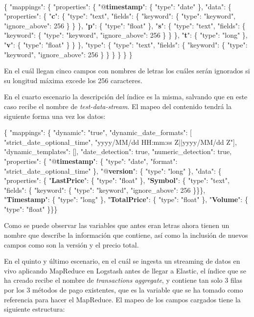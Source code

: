 \paragraph{}

\{ "mappings": \{ "properties": \{ "@\textbf{timestamp}": \{ "type": "date" \}, "data": \{ "properties": \{ "\textbf{c}": \{ "type": "text", "fields": \{ "keyword": \{ "type": "keyword", "ignore\_above": 256 \} \} \}, "\textbf{p}": \{ "type": "float" \}, "\textbf{s}": \{ "type": "text", "fields": \{ "keyword": \{ "type": "keyword", "ignore\_above": 256 \} \} \}, "\textbf{t}": \{ "type": "long" \}, "\textbf{v}": \{ "type": "float" \} \} \}, "type": \{ "type": "text", "fields": \{ "keyword": \{ "type": "keyword", "ignore\_above": 256 \} \} \} \} \} \} 

En el cuál llegan cinco campos con nombres de letras los cuáles serán ignorados si su longitud máxima excede los 256 caracteres.

En el cuarto escenario la descripción del índice es la misma, salvando que en este caso recibe el nombre de \textit{test-data-stream}. El mapeo del contenido tendrá la siguiente forma una vez los datos: 

\{ "mappings": \{ "dynamic": "true", "dynamic\_date\_formats": [ "strict\_date\_optional\_time", "yyyy/MM/dd HH:mm:ss Z||yyyy/MM/dd Z"], "dynamic\_templates": [], "date\_detection": true, "numeric\_detection": true, "properties": \{ "@\textbf{timestamp}": \{ "type": "date", "format": "strict\_date\_optional\_time" \}, "@\textbf{version}": \{ "type": "long" \}, "data": \{ "properties": \{ "\textbf{LastPrice}": \{ "type": "float" \}, "\textbf{Symbol}": \{ "type": "text", "fields": \{ "keyword": \{ "type": "keyword", "ignore\_above": 256 \}\}\}, "\textbf{Timestamp}": \{ "type": "long" \}, "\textbf{TotalPrice}": \{ "type": "float" \}, "\textbf{Volume}": \{ "type": "float" \}\}\}

Como se puede observar las variables que antes eran letras ahora tienen un nombre que describe la información que contiene, así como la inclusión de nuevos campos como son la versión y el precio total.

En el quinto y último escenario, en el cuál se ingesta un streaming de datos en vivo aplicando MapReduce en Logstash antes de llegar a Elastic, el índice que se ha creado recibe el nombre de \textit{transactions aggregate}, y contiene tan solo 3 filas por los 3 métodos de pago existentes, que es la variable que se ha tomado como referencia para hacer el MapReduce. El mapeo de los campos cargados tiene la siguiente estructura:


